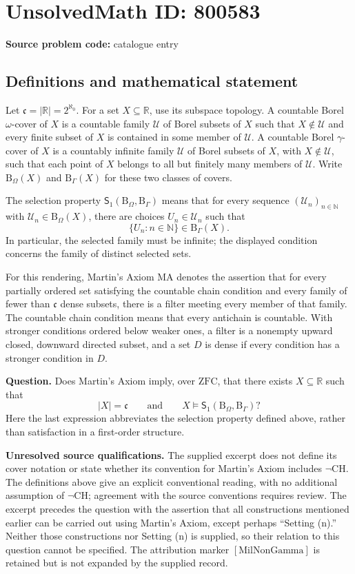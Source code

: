 \documentclass[11pt]{article}
\newcommand{\N}{\mathbb{N}}
\newcommand{\R}{\mathbb{R}}
\begin{document}
\section*{UnsolvedMath ID: 800583}
\textbf{Source problem code:} catalogue entry
\subsection{Definitions and mathematical statement}
Let \(\mathfrak c=|\R|=2^{\aleph_0}\). For a set \(X\subseteq\R\), use its subspace topology. A countable Borel \(\omega\)-cover of \(X\) is a countable family \(\mathcal U\) of Borel subsets of \(X\) such that \(X\notin\mathcal U\) and every finite subset of \(X\) is contained in some member of \(\mathcal U\). A countable Borel \(\gamma\)-cover of \(X\) is a countably infinite family \(\mathcal U\) of Borel subsets of \(X\), with \(X\notin\mathcal U\), such that each point of \(X\) belongs to all but finitely many members of \(\mathcal U\). Write \(\mathrm B_\Omega(X)\) and \(\mathrm B_\Gamma(X)\) for these two classes of covers.

The selection property \(\mathsf S_1(\mathrm B_\Omega,\mathrm B_\Gamma)\) means that for every sequence \((\mathcal U_n)_{n\in\N}\) with \(\mathcal U_n\in\mathrm B_\Omega(X)\), there are choices \(U_n\in\mathcal U_n\) such that
\[
\{U_n:n\in\N\}\in\mathrm B_\Gamma(X).
\]
In particular, the selected family must be infinite; the displayed condition concerns the family of distinct selected sets.

For this rendering, Martin's Axiom \(\mathrm{MA}\) denotes the assertion that for every partially ordered set satisfying the countable chain condition and every family of fewer than \(\mathfrak c\) dense subsets, there is a filter meeting every member of that family. The countable chain condition means that every antichain is countable. With stronger conditions ordered below weaker ones, a filter is a nonempty upward closed, downward directed subset, and a set \(D\) is dense if every condition has a stronger condition in \(D\).

\textbf{Question.} Does Martin's Axiom imply, over \(\mathrm{ZFC}\), that there exists \(X\subseteq\R\) such that
\[
|X|=\mathfrak c
\qquad\text{and}\qquad
X\models\mathsf S_1(\mathrm B_\Omega,\mathrm B_\Gamma)?
\]
Here the last expression abbreviates the selection property defined above, rather than satisfaction in a first-order structure.

\textbf{Unresolved source qualifications.} The supplied excerpt does not define its cover notation or state whether its convention for Martin's Axiom includes \(\neg\mathrm{CH}\). The definitions above give an explicit conventional reading, with no additional assumption of \(\neg\mathrm{CH}\); agreement with the source conventions requires review. The excerpt precedes the question with the assertion that all constructions mentioned earlier can be carried out using Martin's Axiom, except perhaps ``Setting (n).'' Neither those constructions nor Setting (n) is supplied, so their relation to this question cannot be specified. The attribution marker \([\mathrm{MilNonGamma}]\) is retained but is not expanded by the supplied record.
\end{document}
